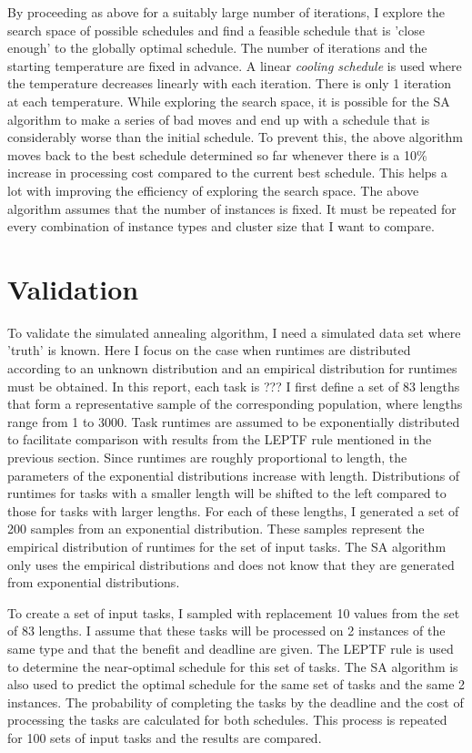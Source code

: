 \documentclass[12pt]{report}
\begin{document}
By proceeding as above for a suitably large number of iterations, I explore the search space of possible schedules and find a feasible schedule that is 'close enough' to the globally optimal schedule. 
The number of iterations and the starting temperature are fixed in advance.
A linear \textit{cooling schedule} is used where the temperature decreases linearly with each iteration.
There is only 1 iteration at each temperature. 
While exploring the search space, it is possible for the SA algorithm to make a series of bad moves and end up with a schedule that is considerably worse than the initial schedule.
To prevent this, the above algorithm moves back to the best schedule determined so far whenever there is a 10\% increase in processing cost compared to the current best schedule.
This helps a lot with improving the efficiency of exploring the search space.
The above algorithm assumes that the number of instances is fixed.
It must be repeated for every combination of instance types and cluster size that I want to compare.

\section{Validation}

To validate the simulated annealing algorithm, I need a simulated data set where 'truth' is known.
Here I focus on the case when runtimes are distributed according to an unknown distribution and an empirical distribution for runtimes must be obtained.
In this report, each task is ???
I first define a set of 83 lengths that form a representative sample of the corresponding population, where lengths range from 1 to 3000.
Task runtimes are assumed to be exponentially distributed to facilitate comparison with results from the LEPTF rule mentioned in the previous section.
Since runtimes are roughly proportional to length, the parameters of the exponential distributions increase with length.
Distributions of runtimes for tasks with a smaller length will be shifted to the left compared to those for tasks with larger lengths.
For each of these lengths, I generated a set of 200 samples from an exponential distribution.
These samples represent the empirical distribution of runtimes for the set of input tasks. 
The SA algorithm only uses the empirical distributions and does not know that they are generated from exponential distributions.

To create a set of input tasks, I sampled with replacement 10 values from the set of 83 lengths.
I assume that these tasks will be processed on 2 instances of the same type and that the benefit and deadline are given.
The LEPTF rule is used to determine the near-optimal schedule for this set of tasks.
The SA algorithm is also used to predict the optimal schedule for the same set of tasks and the same 2 instances.
The probability of completing the tasks by the deadline and the cost of processing the tasks are calculated for both schedules.
This process is repeated for 100 sets of input tasks and the results are compared.
\end{document}
